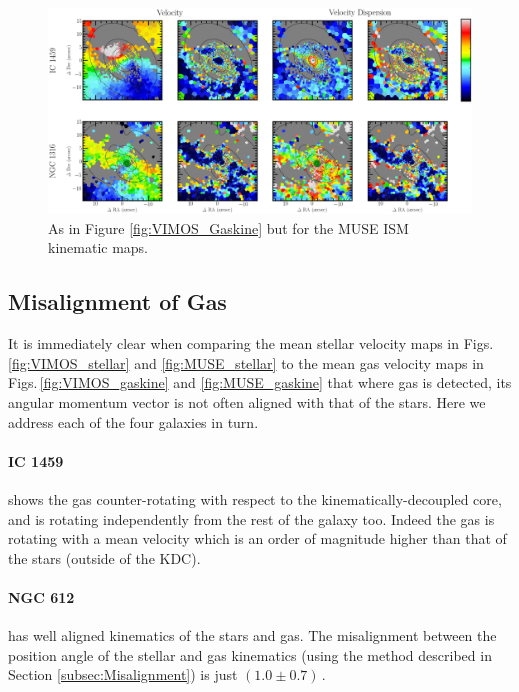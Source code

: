 	\begin{figure}
		\centering
		\includegraphics[height=0.31\textheight]{chapter5/muse/kin.png}
		\caption[MUSE ISM kinematic maps]{As in Figure \ref{fig:VIMOS_Gaskine} but for the MUSE ISM kinematic maps.}
		\label{fig:MUSE_Gaskine}
	\end{figure}












	\subsection{Misalignment of Gas}
		\label{subsec:Gasmisaligment}
		It is immediately clear when comparing the mean stellar velocity maps in Figs.\,\ref{fig:VIMOS_stellar} and \ref{fig:MUSE_stellar} to the mean gas velocity maps in Figs.\,\ref{fig:VIMOS_gaskine} and \ref{fig:MUSE_gaskine} that where gas is detected, its angular momentum vector is not often aligned with that of the stars. Here we address each of the four galaxies in turn. 

		\paragraph{IC 1459} shows the gas counter-rotating with respect to the kinematically-decoupled core, and is rotating independently from the rest of the galaxy too. Indeed the gas is rotating with a mean velocity which is an order of magnitude higher than that of the stars (outside of the KDC).

		\paragraph{NGC 612} has well aligned kinematics of the stars and gas. The misalignment between the position angle of the stellar and gas kinematics (using the method described in Section \ref{subsec:Misalignment}) is just $(1.0\pm0.7)$\,\degree.

